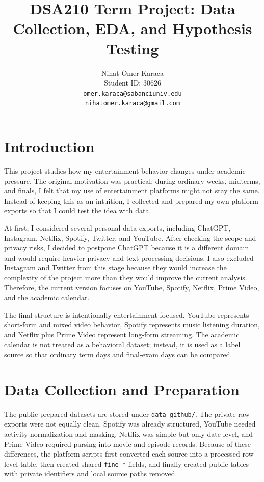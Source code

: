 \documentclass[11pt,a4paper]{article}
\title{\textbf{DSA210 Term Project: Data Collection, EDA, and Hypothesis Testing}}
\author{
Nihat Ömer Karaca\\
Student ID: 30626\\
\texttt{omer.karaca@sabanciuniv.edu}\\
\texttt{nihatomer.karaca@gmail.com}
}
\date{}
\begin{document}
\maketitle
\vspace{-1.1em}

\section*{Introduction}
This project studies how my entertainment behavior changes under academic pressure. The original motivation was practical: during ordinary weeks, midterms, and finals, I felt that my use of entertainment platforms might not stay the same. Instead of keeping this as an intuition, I collected and prepared my own platform exports so that I could test the idea with data.

At first, I considered several personal data exports, including ChatGPT, Instagram, Netflix, Spotify, Twitter, and YouTube. After checking the scope and privacy risks, I decided to postpone ChatGPT because it is a different domain and would require heavier privacy and text-processing decisions. I also excluded Instagram and Twitter from this stage because they would increase the complexity of the project more than they would improve the current analysis. Therefore, the current version focuses on YouTube, Spotify, Netflix, Prime Video, and the academic calendar.

The final structure is intentionally entertainment-focused. YouTube represents short-form and mixed video behavior, Spotify represents music listening duration, and Netflix plus Prime Video represent long-form streaming. The academic calendar is not treated as a behavioral dataset; instead, it is used as a label source so that ordinary term days and final-exam days can be compared.

\section*{Data Collection and Preparation}
The public prepared datasets are stored under \texttt{data\_github/}. The private raw exports were not equally clean. Spotify was already structured, YouTube needed activity normalization and masking, Netflix was simple but only date-level, and Prime Video required parsing into movie and episode records. Because of these differences, the platform scripts first converted each source into a processed row-level table, then created shared \texttt{fine\_*} fields, and finally created public tables with private identifiers and local source paths removed.
\end{document}
